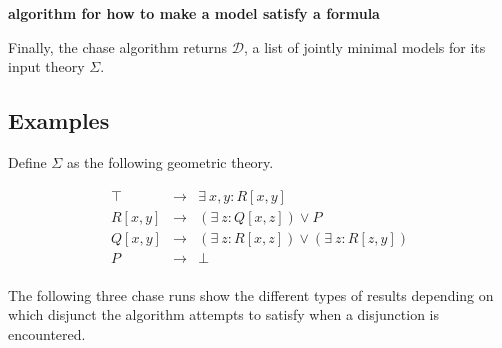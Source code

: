 		\textbf{algorithm for how to make a model satisfy a formula}

		Finally, the chase algorithm returns $\mathcal{D}$, a list of jointly
		minimal models for its input theory $\Sigma$.

	\subsection{Examples}

		Define $\Sigma$ as the following geometric theory.

		\begin{eqnarray}
			\top    &  \to  &  \exists\ x,y : R[x,y]                             \\
			R[x,y]  &  \to  &  (\exists\ z : Q[x,z]) \vee P                      \\
			Q[x,y]  &  \to  &  (\exists\ z : R[x,z]) \vee (\exists\ z : R[z,y])  \\
			P       &  \to  &  \bot                                              \\
		\end{eqnarray}

		The following three chase runs show the different types of results
		depending on which disjunct the algorithm attempts to satisfy when a
		disjunction is encountered.

